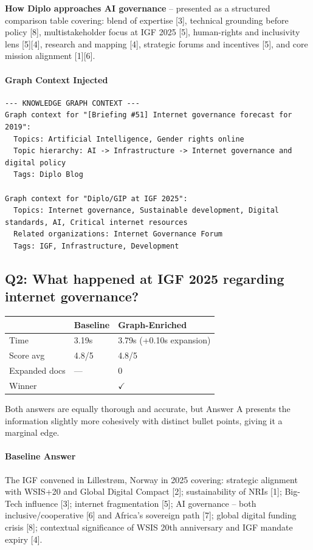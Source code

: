 \documentclass[11pt,a4paper]{article}
\newcommand{\winner}[1]{\textbf{\textcolor{graphwin}{#1}}}
\begin{document}
\textbf{How Diplo approaches AI governance} -- presented as a structured comparison table covering: blend of expertise [3], technical grounding before policy [8], multistakeholder focus at IGF 2025 [5], human-rights and inclusivity lens [5][4], research and mapping [4], strategic forums and incentives [5], and core mission alignment [1][6].

\paragraph{Graph Context Injected}
\begin{lstlisting}
--- KNOWLEDGE GRAPH CONTEXT ---
Graph context for "[Briefing #51] Internet governance forecast for 2019":
  Topics: Artificial Intelligence, Gender rights online
  Topic hierarchy: AI -> Infrastructure -> Internet governance and digital policy
  Tags: Diplo Blog

Graph context for "Diplo/GIP at IGF 2025":
  Topics: Internet governance, Sustainable development, Digital standards, AI, Critical internet resources
  Related organizations: Internet Governance Forum
  Tags: IGF, Infrastructure, Development
\end{lstlisting}

\subsection{Q2: What happened at IGF 2025 regarding internet governance?}

\begin{tabularx}{\textwidth}{lXX}
\toprule
& \textbf{Baseline} & \textbf{Graph-Enriched} \\
\midrule
Time & 3.19s & 3.79s (+0.10s expansion) \\
Score avg & 4.8/5 & 4.8/5 \\
Expanded docs & --- & 0 \\
Winner & & \winner{$\checkmark$} \\
\bottomrule
\end{tabularx}

\begin{tcolorbox}[colback=judgebox, colframe=orange!40!black, title=Judge Reasoning]
Both answers are equally thorough and accurate, but Answer A presents the information slightly more cohesively with distinct bullet points, giving it a marginal edge.
\end{tcolorbox}

\paragraph{Baseline Answer}
The IGF convened in Lillestrøm, Norway in 2025 covering: strategic alignment with WSIS+20 and Global Digital Compact [2]; sustainability of NRIs [1]; Big-Tech influence [3]; internet fragmentation [5]; AI governance -- both inclusive/cooperative [6] and Africa's sovereign path [7]; global digital funding crisis [8]; contextual significance of WSIS 20th anniversary and IGF mandate expiry [4].
\end{document}
